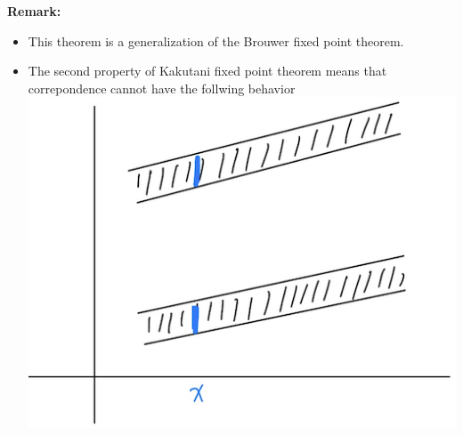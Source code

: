 \textbf{Remark:}
\begin{itemize}
    \item This theorem is a generalization of the Brouwer fixed point theorem.
    \item The second property of Kakutani fixed point theorem means that correpondence cannot have the follwing behavior\bigskip\\
        \includegraphics[scale=0.4]{Images/17.png}
\end{itemize}
